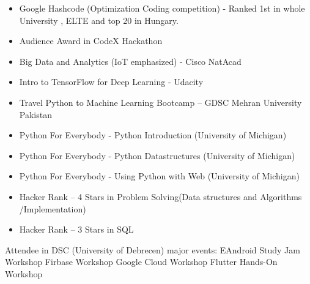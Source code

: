 \documentclass[10pt,a4paper,ragged2e,withhyper]{altacv}
\begin{document}
\begin{paracol}{2}
\divider
{}
\divider
{}
\divider
{}
\divider


\divider




 
\divider
{}
\divider
{}

\medskip
\medskip

\divider
\vspace{20mm}


\begin{itemize}
\item Google Hashcode (Optimization Coding competition) - Ranked 1st in whole University , ELTE and top 20 in Hungary. 
\item Audience Award in CodeX Hackathon 
\item Big Data and Analytics (IoT emphasized) - Cisco NatAcad
\item Intro to TensorFlow for Deep Learning - Udacity
\item Travel Python to Machine Learning Bootcamp -- GDSC Mehran University Pakistan
\item Python For Everybody - Python Introduction (University of Michigan)
\item Python For Everybody - Python Datastructures (University of Michigan)
\item Python For Everybody - Using Python with Web (University of Michigan)
\item Hacker Rank -- 4 Stars in Problem Solving(Data structures and Algorithms /Implementation)
\item Hacker Rank -- 3 Stars in SQL
\end{itemize}
\begin{outline}
\1 Attendee in DSC (University of Debrecen) major events:
\2 EAndroid Study Jam Workshop
\2 Firbase Workshop
\2 Google Cloud Workshop
\2 Flutter Hands-On Workshop
\end{outline}         
	 

\end{paracol}
\end{document}
